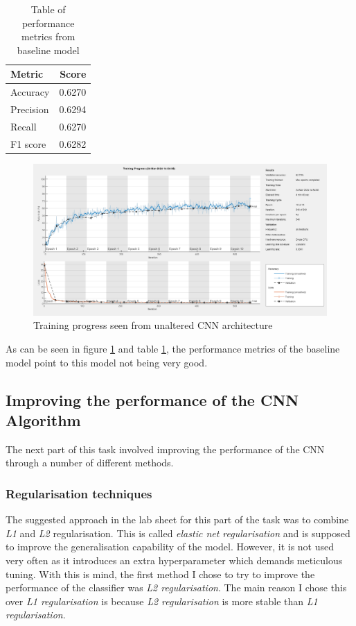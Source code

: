 \documentclass[11pt, letterpaper]{article}
\begin{document}
\begin{table}[ht]
    \begin{center}
      \caption{Table of performance metrics from baseline model}
      \label{tab:BaselinePerformanceMetrics}
      \begin{tabular}{l|r} %
        \textbf{Metric} & \textbf{Score}\\
        \hline
        Accuracy & 0.6270\\
        Precision & 0.6294\\
        Recall & 0.6270\\
        F1 score & 0.6282\\
      \end{tabular}
    \end{center}
  \end{table}

\begin{figure}[ht]
    \centering
    \includegraphics[width=0.75\linewidth]{Lab 5/BaseCNNTrainingProgress.png}
    \caption{Training progress seen from unaltered CNN architecture}
    \label{fig:BaseCNNTrainingProgress}
\end{figure}

As can be seen in figure \ref{fig:BaseCNNTrainingProgress} and table \ref{tab:BaselinePerformanceMetrics}, the performance metrics of the baseline model point to this model not being very good. 

\subsection{Improving the performance of the CNN Algorithm}
The next part of this task involved improving the performance of the CNN  through a number of different methods.
\subsubsection*{Regularisation techniques}
The suggested approach in the lab sheet for this part of the task was to combine \textit{L1} and \textit{L2} regularisation. This is called \textit{elastic net regularisation} and is supposed to improve the generalisation capability of the model. However, it is not used very often as it introduces an extra hyperparameter which demands meticulous tuning. With this is mind, the first method I chose to try to improve the performance of the classifier was \textit{L2 regularisation}. The main reason I chose this over \textit{L1 regularisation} is because \textit{L2 regularisation} is more stable than \textit{L1 regularisation}.
\end{document}
